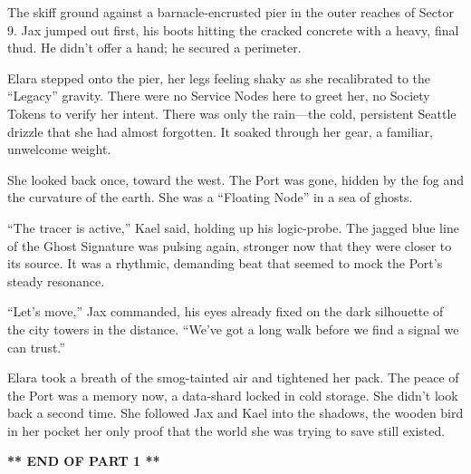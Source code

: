 
The skiff ground against a barnacle-encrusted pier in the outer reaches of Sector 9. Jax jumped out first, his boots hitting the cracked concrete with a heavy, final thud. He didn't offer a hand; he secured a perimeter. 

Elara stepped onto the pier, her legs feeling shaky as she recalibrated to the ``Legacy'' gravity. There were no Service Nodes here to greet her, no Society Tokens to verify her intent. There was only the rain—the cold, persistent Seattle drizzle that she had almost forgotten. It soaked through her gear, a familiar, unwelcome weight.

She looked back once, toward the west. The Port was gone, hidden by the fog and the curvature of the earth. She was a ``Floating Node'' in a sea of ghosts.

``The tracer is active,'' Kael said, holding up his logic-probe. The jagged blue line of the Ghost Signature was pulsing again, stronger now that they were closer to its source. It was a rhythmic, demanding beat that seemed to mock the Port's steady resonance.

``Let's move,'' Jax commanded, his eyes already fixed on the dark silhouette of the city towers in the distance. ``We've got a long walk before we find a signal we can trust.''

Elara took a breath of the smog-tainted air and tightened her pack. The peace of the Port was a memory now, a data-shard locked in cold storage. She didn't look back a second time. She followed Jax and Kael into the shadows, the wooden bird in her pocket her only proof that the world she was trying to save still existed.

\textbf{** END OF PART 1 **}